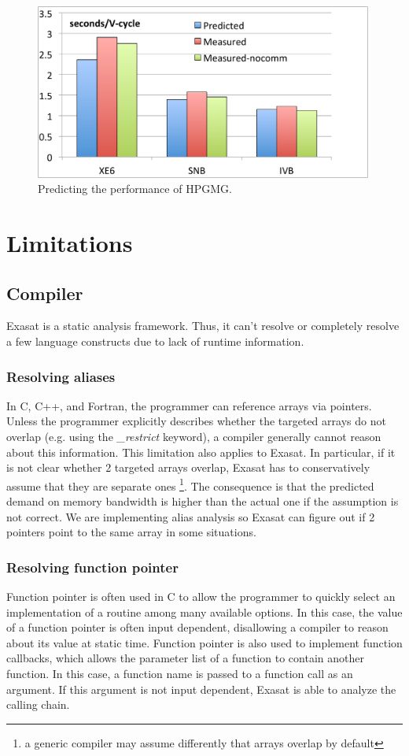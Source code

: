 \documentclass{article}
\begin{document}
\begin{figure}[htp]
\centering
\includegraphics[width=0.99\textwidth]{hpgmg_overall}
\caption{Predicting the performance of HPGMG.}
\label{hpgmg_overall}
\end{figure}


\section{Limitations}

\subsection{Compiler}
Exasat is a static analysis framework.
Thus, it can't resolve or completely resolve a few language constructs due to lack of runtime information. 

\subsubsection{Resolving aliases}
In C, C++, and Fortran, the programmer can reference arrays via pointers.
Unless the programmer explicitly describes whether the targeted arrays do not overlap (e.g. using the {\em \_restrict} keyword), a compiler generally cannot reason about this information. 
This limitation also applies to Exasat.
In particular, if it is not clear whether 2 targeted arrays overlap, Exasat has to conservatively assume that they are separate ones \footnote{a generic compiler may assume differently that arrays overlap by default}.
The consequence is that the predicted demand on memory bandwidth is higher than the actual one if the assumption is not correct.
We are implementing alias analysis so Exasat can figure out if 2 pointers point to the same array in some situations.

\subsubsection{Resolving function pointer}
Function pointer is often used in C to allow the programmer to quickly select an implementation of a routine among many available options.
In this case, the value of a function pointer is often input dependent, disallowing a compiler to reason about its value at static time.
Function pointer is also used to implement function callbacks, which allows the parameter list of a function to contain another function.
In this case, a function name is passed to a function call as an argument.
If this argument is not input dependent, Exasat is able to analyze the calling chain. 
\end{document}
